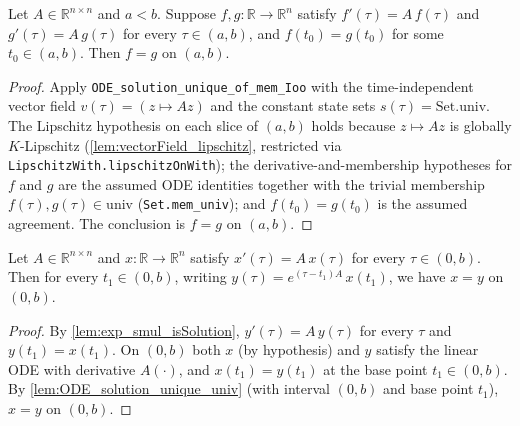 \begin{lemma}
    \label{lem:ODE_solution_unique_univ}
    \leanok
    Let $A \in \mathbb{R}^{n \times n}$ and $a < b$. Suppose $f, g \colon
    \mathbb{R} \to \mathbb{R}^{n}$ satisfy $f'(\tau) = A\,f(\tau)$ and $g'(\tau) =
    A\,g(\tau)$ for every $\tau \in (a,b)$, and $f(t_0) = g(t_0)$ for some $t_0
    \in (a,b)$. Then $f = g$ on $(a,b)$.
\end{lemma}
\begin{proof}
    Apply \texttt{ODE\_solution\_unique\_of\_mem\_Ioo} with the time-independent
    vector field $v(\tau) = (z \mapsto A z)$ and the constant state sets
    $s(\tau) = \mathrm{Set.univ}$. The Lipschitz hypothesis on each slice of
    $(a,b)$ holds because $z \mapsto A z$ is globally $K$-Lipschitz
    (\cref{lem:vectorField_lipschitz}, restricted via
    \texttt{LipschitzWith.lipschitzOnWith}); the derivative-and-membership
    hypotheses for $f$ and $g$ are the assumed ODE identities together with the
    trivial membership $f(\tau), g(\tau) \in \mathrm{univ}$
    (\texttt{Set.mem\_univ}); and $f(t_0) = g(t_0)$ is the assumed agreement. The
    conclusion is $f = g$ on $(a,b)$.
\end{proof}

\begin{lemma}
    \label{lem:solution_eqOn_exp_smul}
    \leanok
    Let $A \in \mathbb{R}^{n \times n}$ and $x \colon \mathbb{R} \to \mathbb{R}^{n}$
    satisfy $x'(\tau) = A\,x(\tau)$ for every $\tau \in (0,b)$. Then for every
    $t_1 \in (0,b)$, writing $y(\tau) = e^{(\tau - t_1)A}\, x(t_1)$, we have
    $x = y$ on $(0,b)$.
\end{lemma}
\begin{proof}
    By \cref{lem:exp_smul_isSolution}, $y'(\tau) = A\,y(\tau)$ for every $\tau$
    and $y(t_1) = x(t_1)$. On $(0,b)$ both $x$ (by hypothesis) and $y$ satisfy
    the linear ODE with derivative $A(\cdot)$, and $x(t_1) = y(t_1)$ at the base
    point $t_1 \in (0,b)$. By \cref{lem:ODE_solution_unique_univ} (with interval
    $(0,b)$ and base point $t_1$), $x = y$ on $(0,b)$.
\end{proof}

